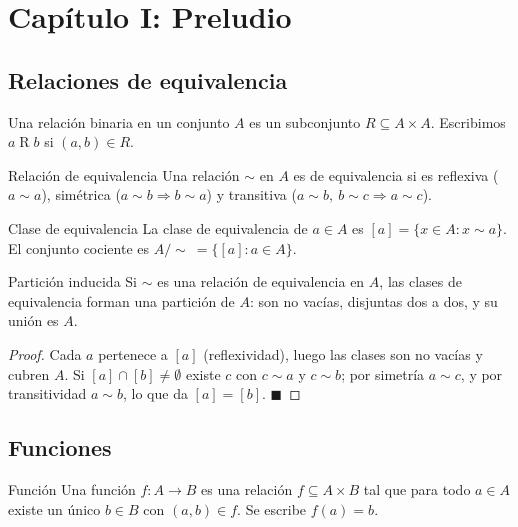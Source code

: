 \documentclass[12pt]{article}
\begin{document}
\section{Capítulo I: Preludio}

\subsection{Relaciones de equivalencia}

\begin{definicion}[1.1]{}
Una relación binaria en un conjunto $A$ es un subconjunto $R \subseteq A \times A$. Escribimos $a \mathrel{R} b$ si $(a,b) \in R$.
\end{definicion}

\begin{definicion}[1.2]{Relación de equivalencia}
Una relación $\sim$ en $A$ es de equivalencia si es reflexiva ($a \sim a$), simétrica ($a \sim b \Rightarrow b \sim a$) y transitiva ($a \sim b,\ b \sim c \Rightarrow a \sim c$).
\end{definicion}

\begin{definicion}[1.3]{Clase de equivalencia}
La clase de equivalencia de $a \in A$ es $[a] = \{x \in A : x \sim a\}$. El conjunto cociente es $A/{\sim}\ = \{[a] : a \in A\}$.
\end{definicion}

\begin{teorema}[1.1]{Partición inducida}
Si $\sim$ es una relación de equivalencia en $A$, las clases de equivalencia forman una partición de $A$: son no vacías, disjuntas dos a dos, y su unión es $A$.
\end{teorema}
\begin{proof}
Cada $a$ pertenece a $[a]$ (reflexividad), luego las clases son no vacías y cubren $A$. Si $[a] \cap [b] \neq \emptyset$ existe $c$ con $c \sim a$ y $c \sim b$; por simetría $a \sim c$, y por transitividad $a \sim b$, lo que da $[a] = [b]$. $\blacksquare$
\end{proof}

\subsection{Funciones}

\begin{definicion}[1.4]{Función}
Una función $f : A \to B$ es una relación $f \subseteq A \times B$ tal que para todo $a \in A$ existe un único $b \in B$ con $(a,b) \in f$. Se escribe $f(a) = b$.
\end{definicion}
\end{document}
